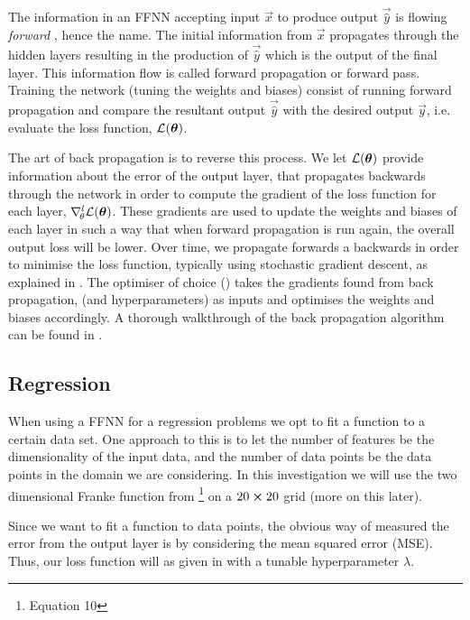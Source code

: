     The information in an FFNN accepting input $\vec{x}$ to produce output $\vec{\hat{y}}$ is flowing \textit{forward} \citep{Goodfellow2016}, hence the name. The initial information from $\vec{x}$ propagates through the hidden layers resulting in the production of $\vec{\hat{y}}$ which is the output of the final layer. This information flow is called forward propagation or forward pass. Training the network (tuning the weights and biases) consist of running forward propagation and compare the resultant output $\vec{\hat{y}}$ with the desired output $\vec{y}$, i.e. evaluate the loss function, $\mathcal{L}(\boldsymbol{\theta})$. 
    

    The art of back propagation is to reverse this process. We let $\mathcal{L}(\boldsymbol{\theta})$ provide information about the error of the output layer, that propagates backwards through the network in order to compute the gradient of the loss function for each layer, $\nabla^l_{\!\theta}\mathcal{L}(\boldsymbol{\theta})$. These gradients are used to update the weights and biases of each layer in such a way that when forward propagation is run again, the overall output loss will be lower. Over time, we propagate forwards a backwards in order to minimise the loss function, typically using stochastic gradient descent, as explained in . The optimiser of choice () takes the gradients found from back propagation, (and hyperparameters) as inputs and optimises the weights and biases accordingly. A thorough walkthrough of the back propagation algorithm can be found in \citep[chapter 6.5]{Goodfellow2016}.

\subsection{Regression}\label{sec:regression}
    When using a FFNN for a regression problems we opt to fit a function to a certain data set. One approach to this is to let the number of features be the dimensionality of the input data, and the number of data points be the data points in the domain we are considering. In this investigation we will use the two dimensional Franke function from \projectOne\footnote{Equation 10} on a $20\cross 20$ grid (more on this later).
    
    Since we want to fit a function to data points, the obvious way of measured the error from the output layer is by considering the mean squared error (MSE). Thus, our loss function will as given in  with a tunable hyperparameter $\lambda$. 

